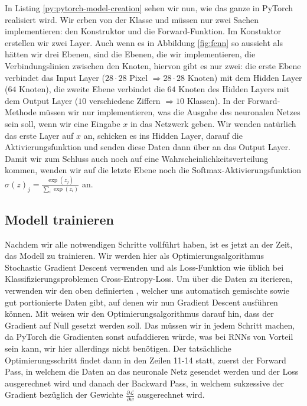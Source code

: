 
In Listing \ref{py:pytorch-model-creation} sehen wir nun, wie das ganze in PyTorch realisiert wird. 
Wir erben von der Klasse  und müssen nur zwei Sachen implementieren: 
den Konstruktor und die Forward-Funktion.
Im Konstuktor erstellen wir zwei Layer. Auch wenn es in Abbildung \ref{fig:fcnn} 
so aussieht als hätten wir drei Ebenen, sind die Ebenen, die wir implementieren, 
die Verbindungslinien zwischen den Knoten, hiervon gibt es nur zwei: 
die erste Ebene verbindet das Input Layer (\(28 \cdot 28\) Pixel \(\Rightarrow 28 \cdot 28\) Knoten) 
mit dem Hidden Layer (\(64\) Knoten), die zweite Ebene verbindet die \(64\) Knoten des Hidden Layers
mit dem Output Layer (\(10\) verschiedene Ziffern \(\Rightarrow 10\) Klassen).
In der Forward-Methode müssen wir nur implementieren, was die Ausgabe des 
neuronalen Netzes sein soll, wenn wir eine Eingabe \(x\) in das Netzwerk geben. 
Wir wenden natürlich das erste Layer auf \(x\) an, schicken es ins Hidden Layer, 
darauf die Aktivierungsfunktion und senden diese Daten dann über  an das Output Layer.
Damit wir zum Schluss auch noch auf eine Wahrscheinlichkeitsverteilung kommen, 
wenden wir auf die letzte Ebene noch die Softmax-Aktivierungsfunktion \(\sigma(z)_j = \frac{\exp(z_j)}{\sum_{i} \exp(z_i)}\) an.

\subsection{Modell trainieren}
Nachdem wir alle notwendigen Schritte vollführt haben, ist es jetzt an der Zeit, das Modell zu trainieren. 
Wir werden hier als Optimierungsalgorithmus Stochastic Gradient Descent verwenden und als Loss-Funktion 
wie üblich bei Klassifizierungsproblemen Cross-Entropy-Loss. 
Um über die Daten zu iterieren, verwenden wir den oben definierten 
, welcher uns automatisch gemischte sowie gut portionierte Daten 
gibt, auf denen wir nun Gradient Descent ausführen können. 
Mit  weisen wir den Optimierungsalgorithmus darauf hin, 
dass der Gradient auf Null gesetzt werden soll. Das müssen wir in jedem Schritt machen, 
da PyTorch die Gradienten sonst aufaddieren würde, was bei RNNs von Vorteil sein kann, wir hier allerdings nicht benötigen.
Der tatsächliche Optimierungsschritt findet dann in den Zeilen 11-14 statt, 
zuerst der Forward Pass, in welchem die Daten an das neuronale 
Netz gesendet werden und der Loss ausgerechnet wird und danach der Backward Pass, 
in welchem sukzessive der Gradient bezüglich der Gewichte \(\frac{\partial \mathcal{L}}{\partial w}\)
ausgerechnet wird.

